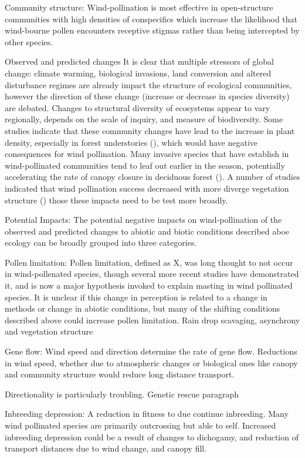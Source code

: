 \documentclass[12pt]{article}
\begin{document}
Community structure:
Wind-pollination is most effective in open-structure communities with high densities of conspecifics which increase the likelihood that wind-bourne pollen encounters receptive stigmas rather than being intercepted by other species. 

Observed and predicted changes
It is clear that multiple stressors of global change: climate warming, biological invasions, land conversion and altered disturbance regimes are already impact the structure of ecological communities, however the direction of these change (increase or decrease in species diversity) are debated. Changes to structural diversity of ecosystems appear to vary regionally, depends on the scale of inquiry, and measure of biodiversity. Some studies indicate that these community changes have lead to the increase in plant density, especially in forest understories (), which would have negative consequences for wind pollination. Many invasive species that have establish in wind-pollinated communities tend to leaf out earlier in the season, potentially accelerating the rate of canopy closure in deciduous forest ().  A number of studies indicated that wind pollination success decreased with more diverge vegetation structure () those these impacts need to be test more broadly. 

Potential Impacts:
The potential negative impacts on wind-pollination of the observed and predicted changes to abiotic and biotic conditions described aboe ecology can be broadly grouped into three categories.

Pollen limitation: Pollen limitation, defined as X, was long thought to not occur in wind-pollenated species, though several more recent studies have demonstrated it, and is now a major hypothesis invoked to explain masting in wind pollinated species. It is unclear if this change in perception is related to a change in methods or change in abiotic conditions, but many of the shifting conditions described above could increase pollen limitation. Rain drop scavaging, asynchrony and vegetation structure

Gene flow: Wind speed and direction determine the rate of gene flow. Reductions in wind speed, whether due to atmospheric changes or biological ones like canopy and community structure would reduce long distance transport.

Directionality is particularly troubling. Genetic rescue paragraph


Inbreeding depression: A reduction in fitness to due continue inbreeding. Many wind pollinated species are primarily outcrossing but able to self. Increased inbreeding depression could be a result of changes to dichogamy, and reduction of transport distances due to wind change, and canopy fill.
\end{document}
